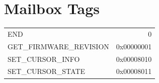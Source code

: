 \documentclass[12pt, svgnames]{book}
\begin{document}
\newpage
\section{Mailbox Tags}
\hypertarget{Mailbox Tags}{}
\begin{centering}
	{
	\begin{longtable}{|l | r |}
		\hline
		 END &                                    0\\
		 GET\_FIRMWARE\_REVISION &                  0x00000001\\
		 
		 SET\_CURSOR\_INFO &                        0x00008010\\
		 SET\_CURSOR\_STATE &                       0x00008011\\
		 

\end{longtable}}
\end{centering}
\end{document}
